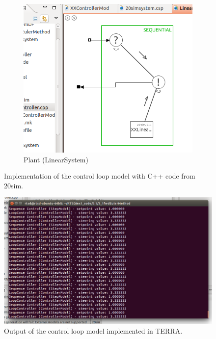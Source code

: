 \documentclass[a4paper,twoside,11pt]{article}
\begin{document}
\begin{figure}
\begin{subfigure}{0.5\textwidth}
	 \includegraphics[width=\textwidth]{./images/3-1_terra_linearsystem.png}
	 \caption{Plant (LinearSystem)}
	 \label{fig:3_1_terra_linearsystem}
	\end{subfigure}
	\caption{Implementation of the control loop model with C++ code from 20sim.}
	\label{fig:3_1_terra_model}
\end{figure}

\begin{figure}
	\centering
	\includegraphics[width=\textwidth]{./images/3-1_terra_output.png}
	\caption{Output of the control loop model implemented in TERRA.}
	\label{fig:3_1_terra_output}
\end{figure}
\end{document}
